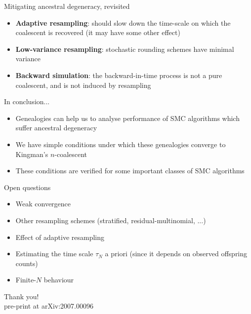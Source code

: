\documentclass[aspectratio=169]{beamer}
\theoremstyle{definition}
\begin{document}
\begin{frame}{Mitigating ancestral degeneracy, revisited}
\begin{itemize}
\item \textbf{Adaptive resampling}: should slow down the time-scale on which the coalescent is recovered (it may have some other effect)
\item \textbf{Low-variance resampling}: stochastic rounding schemes have minimal variance
\item \textbf{Backward simulation}: the backward-in-time process is not a pure coalescent, and is not induced by resampling
\end{itemize}
\end{frame}


\begin{frame}{In conclusion...}
\begin{itemize}
\item Genealogies can help us to analyse performance of SMC algorithms which suffer ancestral degeneracy
\item We have simple conditions under which these genealogies converge to Kingman's $n$-coalescent
\item These conditions are verified for some important classes of SMC algorithms
\end{itemize}
\end{frame}


\begin{frame}{Open questions}
\begin{itemize}
\item Weak convergence
\item Other resampling schemes (stratified, residual-multinomial, ...)
\item Effect of adaptive resampling
\item Estimating the time scale $\tau_N$ a priori (since it depends on observed offspring counts)
\item Finite-$N$ behaviour
\end{itemize}
\end{frame}


\begin{frame}
\centering
\vspace{1cm}
{\Large Thank you!}\\
\vspace{1cm}
pre-print at arXiv:2007.00096
\end{frame}
\end{document}
